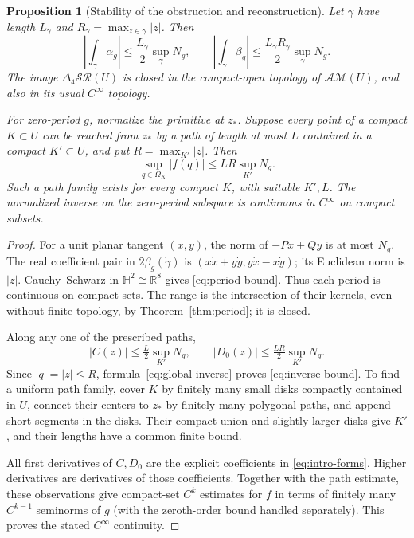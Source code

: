 \documentclass[11pt,a4paper]{article}
\numberwithin{equation}{section}
\newtheorem{proposition}[theorem]{Proposition}
\theoremstyle{definition}
\theoremstyle{remark}
\newcommand{\R}{\mathbb R}
\newcommand{\HH}{\mathbb H}
\newcommand{\SR}{\mathcal{SR}}
\newcommand{\AM}{\mathcal{AM}}
\newcommand{\lap}{\Delta_4}
\begin{document}
\begin{proposition}[Stability of the obstruction and reconstruction]
\label{prop:stability}
Let $\gamma$ have length $L_\gamma$ and
$R_\gamma=\max_{z\in\gamma}|z|$. Then
\begin{equation}\label{eq:period-bound}
 \left|\int_\gamma\alpha_g\right|
       \le\frac{L_\gamma}{2}\sup_\gamma N_g,\qquad
 \left|\int_\gamma\beta_g\right|
       \le\frac{L_\gamma R_\gamma}{2}\sup_\gamma N_g.
\end{equation}
The image $\lap\SR(U)$ is closed in the compact-open topology of
$\AM(U)$, and also in its usual $C^\infty$ topology.

For zero-period $g$, normalize the primitive at $z_*$. Suppose every point
of a compact $K\subset U$ can be reached from $z_*$ by a path of length
at most $L$ contained in a compact $K'\subset U$, and put
$R=\max_{K'}|z|$. Then
\begin{equation}\label{eq:inverse-bound}
 \sup_{q\in\Omega_K}|f(q)|\le LR\sup_{K'}N_g.
\end{equation}
Such a path family exists for every compact $K$, with suitable $K',L$.
The normalized inverse on the zero-period subspace is continuous in
$C^\infty$ on compact subsets.
\end{proposition}
\begin{proof}
For a unit planar tangent $(\dot x,\dot y)$, the norm of
$-P\dot x+Q\dot y$ is at most $N_g$. The real coefficient pair in
$2\beta_g(\dot\gamma)$ is
$(x\dot x+y\dot y,y\dot x-x\dot y)$; its Euclidean norm is $|z|$.
Cauchy--Schwarz in $\HH^2\cong\R^8$ gives \eqref{eq:period-bound}.
Thus each period is continuous on compact sets. The range is the
intersection of their kernels, even without finite topology, by
Theorem~\ref{thm:period}; it is closed.

Along any one of the prescribed paths,
\[
 |C(z)|\le\tfrac L2\sup_{K'}N_g,\qquad
 |D_0(z)|\le\tfrac {LR}2\sup_{K'}N_g.
\]
Since $|q|=|z|\le R$, formula~\eqref{eq:global-inverse} proves
\eqref{eq:inverse-bound}. To find a uniform path family, cover $K$ by
finitely many small disks compactly contained in $U$, connect their
centers to $z_*$ by finitely many polygonal paths, and append short
segments in the disks. Their compact union and slightly larger disks
give $K'$, and their lengths have a common finite bound.

All first derivatives of $C,D_0$ are the explicit coefficients in
\eqref{eq:intro-forms}. Higher derivatives are derivatives of those
coefficients. Together with the path estimate, these observations give
compact-set $C^k$ estimates for $f$ in terms of finitely many $C^{k-1}$
seminorms of $g$ (with the zeroth-order bound handled separately).
This proves the stated $C^\infty$ continuity.
\end{proof}
\end{document}
